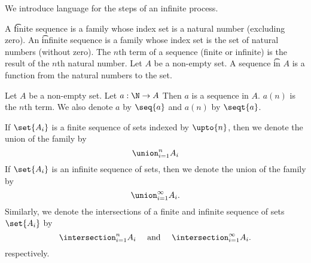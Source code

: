

We introduce language for the steps of an infinite process.


A \t{finite sequence} is a family whose index set is a natural number (excluding zero).
An \t{infinite sequence} is a family whose index set is the set of natural numbers (without zero).
The \t{$n$th term} of a sequence (finite or infinite) is the result of the $n$th natural number.
Let $A$ be a non-empty set.
A sequence \t{in} $A$ is a function from the natural numbers to the set.


Let $A$ be a non-empty set.
Let $a: \N \to A$
Then $a$ is a sequence in $A$.
$a(n)$ is the $n$th term.
We also denote $a$ by
$\seq{a}$ and $a(n)$ by $\seqt{a}$.



If $\set{A_i}$ is a finite sequence of sets indexed by $\upto{n}$, then we denote the union of the family by
\[
  \union_{i = 1}^{n} A_i
\]
If $\set{A_i}$ is an infinite sequence of sets, then we denote the union of the family by
\[
  \union_{i = 1}^{\infty} A_i.
\]
Similarly, we denote the intersections of a finite and infinite sequence of sets $\set{A_i}$ by
\[
  \intersection_{i = 1}^{n} A_i \quad \text{ and } \quad \intersection_{i = 1}^{\infty} A_i.
\]
respectively.


%



%
%
%
%
%
